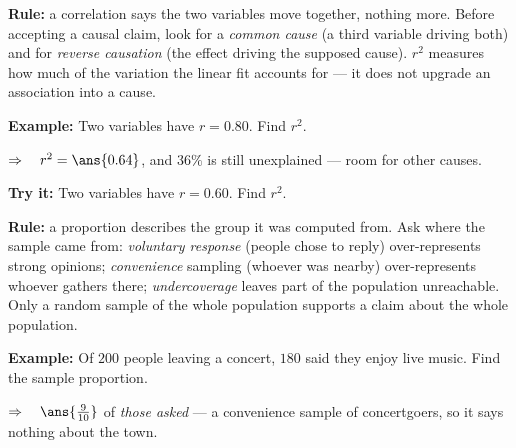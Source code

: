 \documentclass[12pt]{article}
\begin{document}


\begin{formulabox}
\textbf{Rule:} a correlation says the two variables move together, nothing more. Before
accepting a causal claim, look for a \emph{common cause} (a third variable driving both) and
for \emph{reverse causation} (the effect driving the supposed cause). $r^2$ measures how much
of the variation the linear fit accounts for --- it does not upgrade an association into a
cause.
\end{formulabox}

\begin{examplebox}
\textbf{Example:} \quad Two variables have $r = 0.80$. Find $r^2$.

$\Rightarrow\quad r^2 = \ans{0.64}$, and $36\%$ is still unexplained --- room for other causes.
\end{examplebox}

\begin{tryitbox}
\textbf{Try it:} \quad Two variables have $r = 0.60$. Find $r^2$.\\[2pt]
\end{tryitbox}


\begin{formulabox}
\textbf{Rule:} a proportion describes the group it was computed from. Ask where the sample came
from: \emph{voluntary response} (people chose to reply) over-represents strong opinions;
\emph{convenience} sampling (whoever was nearby) over-represents whoever gathers there;
\emph{undercoverage} leaves part of the population unreachable. Only a random sample of the
whole population supports a claim about the whole population.
\end{formulabox}

\begin{examplebox}
\textbf{Example:} \quad Of $200$ people leaving a concert, $180$ said they enjoy live music. Find the sample proportion.

$\Rightarrow\quad \ans{\tfrac{9}{10}}$ of \emph{those asked} --- a convenience sample of concertgoers, so it says nothing about the town.
\end{examplebox}
\end{document}
